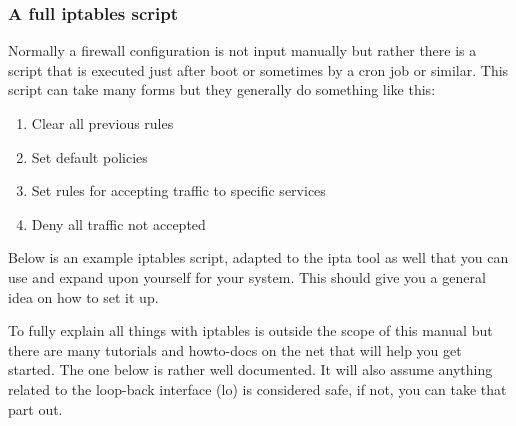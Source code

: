 \documentclass[english,twoside,openright,a4paper,12pt]{article}
\begin{document}
\subsubsection{A full iptables script}

Normally a firewall configuration is not input manually but rather
there is a script that is executed just after boot or sometimes by a
cron job or similar. This script can take many forms but they
generally do something like this:

\begin{enumerate}
\item Clear all previous rules
\item Set default policies
\item Set rules for accepting traffic to specific services
\item Deny all traffic not accepted
\end{enumerate}


Below is an example iptables script, adapted to the ipta tool as well
that you can use and expand upon yourself for your system. This should
give you a general idea on how to set it up.

To fully explain all things with iptables is outside the scope of this
manual but there are many tutorials and howto-docs on the net that
will help you get started. The one below is rather well documented. It
will also assume anything related to the loop-back interface (lo) is
considered safe, if not, you can take that part out.

\small
\end{document}
